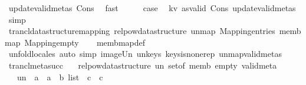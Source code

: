 \begin{isabellebody}
\ update{\isacharunderscore}{\kern0pt}valid{\isacharunderscore}{\kern0pt}metas\ Cons{\isacharparenleft}{\kern0pt}{}{\isacharparenright}{\kern0pt}\ \isamarkupfalse%
\ fast\isanewline
\ \ \isamarkupfalse%
\ \isamarkupfalse%
\ {\isacharquery}{\kern0pt}case\ \isamarkupfalse%
\ kv\ as{\isacharunderscore}{\kern0pt}valid\ Cons\ update{\isacharunderscore}{\kern0pt}valid{\isacharunderscore}{\kern0pt}metas\ \isamarkupfalse%
\ simp\isanewline
{}\isamarkupfalse%
%
\endisatagproof
{\isafoldproof}%
%
\isadelimproof
\isanewline
%
\endisadelimproof
\isanewline
{}\isamarkupfalse%
\ trancl{\isacharunderscore}{\kern0pt}data{\isacharunderscore}{\kern0pt}structure{\isacharunderscore}{\kern0pt}mapping{\isacharcolon}{\kern0pt}\ relpow{\isacharunderscore}{\kern0pt}data{\isacharunderscore}{\kern0pt}structure\ un{\isacharunderscore}{\kern0pt}map\ Mapping{\isachardot}{\kern0pt}entries\ memb{\isacharunderscore}{\kern0pt}map\ Mapping{\isachardot}{\kern0pt}empty\isanewline
%
\isadelimproof
\ \ %
\endisadelimproof
%
\isatagproof
{}\isamarkupfalse%
\ memb{\isacharunderscore}{\kern0pt}map{\isacharunderscore}{\kern0pt}def\isanewline
\ \ \isamarkupfalse%
\ {\isacharparenleft}{\kern0pt}unfold{\isacharunderscore}{\kern0pt}locales{\isacharcomma}{\kern0pt}\ auto\ simp{\isacharcolon}{\kern0pt}\ image{\isacharunderscore}{\kern0pt}Un\ un{\isacharunderscore}{\kern0pt}keys\ keys{\isacharunderscore}{\kern0pt}is{\isacharunderscore}{\kern0pt}none{\isacharunderscore}{\kern0pt}rep\ un{\isacharunderscore}{\kern0pt}map{\isacharunderscore}{\kern0pt}valid{\isacharunderscore}{\kern0pt}metas{\isacharparenright}{\kern0pt}%
\endisatagproof
{\isafoldproof}%
%
\isadelimproof
%
\endisadelimproof
%
\isadelimdocument
%
\endisadelimdocument
%
\isatagdocument
%
\isamarkuptrue%
%
\endisatagdocument
{\isafolddocument}%
%
\isadelimdocument
%
\endisadelimdocument
{}\isamarkupfalse%
\ trancl{\isacharunderscore}{\kern0pt}meta{\isacharunderscore}{\kern0pt}succ\ {\isacharequal}{\kern0pt}\isanewline
\ \ relpow{\isacharunderscore}{\kern0pt}data{\isacharunderscore}{\kern0pt}structure\ un\ set{\isacharunderscore}{\kern0pt}of\ memb\ empty\ valid{\isacharunderscore}{\kern0pt}meta\isanewline
\ \ \ un\ {\isacharcolon}{\kern0pt}{\isacharcolon}{\kern0pt}\ {\isachardoublequoteopen}{\isacharparenleft}{\kern0pt}{\isacharparenleft}{\kern0pt}{\isacharprime}{\kern0pt}a\ {\isacharasterisk}{\kern0pt}\ {\isacharprime}{\kern0pt}a{\isacharparenright}{\kern0pt}\ {\isacharasterisk}{\kern0pt}\ {\isacharprime}{\kern0pt}b{\isacharparenright}{\kern0pt}\ list\ {\isasymRightarrow}\ {\isacharprime}{\kern0pt}c\ {\isasymRightarrow}\ {\isacharprime}{\kern0pt}c{\isachardoublequoteclose}\isanewline

\end{isabellebody}
